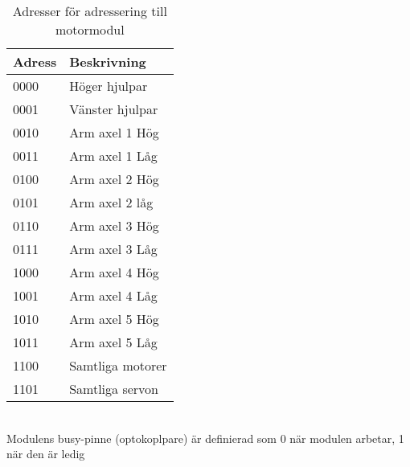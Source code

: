 \begin{table}[h]
	\centering
		\begin{tabularx}{\textwidth}{| l | X |}
			\hline
			\textbf{Adress} & \textbf{Beskrivning} \\
			\hline
			{0000} & {Höger hjulpar} \\
			\hline
			{0001} & {Vänster hjulpar} \\
			\hline
			{0010} & {Arm axel 1 Hög} \\ %
			\hline
			{0011} & {Arm axel 1 Låg} \\
			\hline
			{0100} & {Arm axel 2 Hög} \\
			\hline
			{0101} & {Arm axel 2 låg} \\
			\hline
			{0110} & {Arm axel 3 Hög} \\
			\hline
			{0111} & {Arm axel 3 Låg} \\
			\hline
			{1000} & {Arm axel 4 Hög} \\
			\hline
			{1001} & {Arm axel 4 Låg} \\
			\hline
			{1010} & {Arm axel 5 Hög} \\
			\hline
			{1011} & {Arm axel 5 Låg} \\ %
			\hline
			{1100} & {Samtliga motorer} \\
			\hline
			{1101} & {Samtliga servon} \\
			\hline
		\end{tabularx}
	\caption{Adresser för adressering till motormodul} \label{protokoll:pc-motor-adress}
\end{table}
 \\


Modulens busy-pinne (optokoplpare) är definierad som 0 när modulen arbetar, 1 när den är ledig
